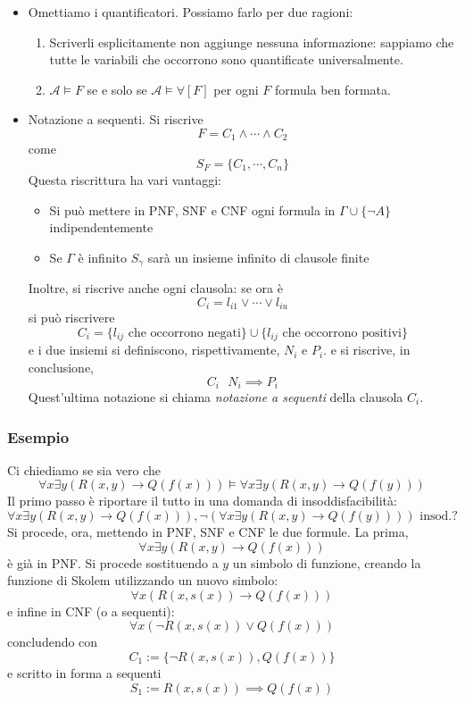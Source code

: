 \begin{itemize}
        \item Omettiamo i quantificatori. Possiamo farlo per due ragioni: 
                \begin{enumerate}
                        \item Scriverli esplicitamente non aggiunge nessuna informazione: 
                                sappiamo che tutte le variabili che occorrono 
                                sono quantificate universalmente.
                        \item $\mathcal{A} \models F$ se e solo se $\mathcal{A} \models \forall[F]$ per ogni 
                                $F$ formula ben formata. 
                \end{enumerate}

        \item Notazione a sequenti. Si riscrive
                $$
                F = C_1 \land \cdots \land C_2
                $$
        come 
                $$
                S_F = \{C_1, \cdots, C_n\}
                $$
        Questa riscrittura ha vari vantaggi: 
        \begin{itemize}
                \item Si può mettere in PNF, SNF e CNF ogni formula 
                        in $\Gamma \cup \{\neg A\}$ indipendentemente
                \item Se $\Gamma$ è infinito $S_{\gamma}$ sarà un insieme 
                        infinito di clausole finite
        \end{itemize}
        Inoltre, si riscrive anche ogni clausola: se ora è 
        $$
        C_i = l_{i1} \lor \cdots \lor l_{iu}
        $$
        si può riscrivere 
        $$
        C_i = \{l_{ij} \text{ che occorrono negati}\} \cup \{l_{ij} \text{ che occorrono positivi}\}
        $$
        e i due insiemi si definiscono, rispettivamente, $N_i$ e $P_i$. 
        e si riscrive, in conclusione, 
        $$
        C_i ~~~ N_i \implies P_i
        $$
        Quest'ultima notazione si chiama \textit{notazione a sequenti} della clausola 
        $C_i$. 
\end{itemize}

\subsubsection{Esempio}
Ci chiediamo se sia vero che
$$
\forall x \exists y (R(x,y) \rightarrow Q(f(x))) \models \forall x \exists y (R(x,y) \rightarrow Q(f(y)))
$$
Il primo passo è riportare il tutto in una domanda di insoddisfacibilità: 
$$
\forall x \exists y (R(x,y) \rightarrow Q(f(x))), \neg (\forall x \exists y (R(x,y) \rightarrow Q(f(y)))) \text{ insod.?}
$$
Si procede, ora, mettendo in PNF, SNF e CNF le due formule.
La prima, 
$$
\forall x \exists y (R(x,y) \rightarrow Q(f(x)))
$$
è già in PNF. Si procede sostituendo a $y$ un simbolo di funzione, creando la 
funzione di Skolem utilizzando un nuovo simbolo: 
$$
\forall x (R(x, s(x)) \rightarrow Q(f(x)))
$$
e infine in CNF (o a sequenti): 
$$
\forall x (\neg R(x, s(x)) \lor Q(f(x)))
$$
concludendo con 
$$
C_1 := \{\neg R(x,s(x)), Q(f(x))\}
$$
e scritto in forma a sequenti 
$$
S_1 := R(x, s(x)) \implies Q(f(x))
$$

